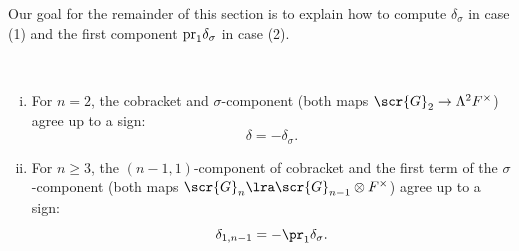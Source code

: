 \documentclass[a4paper]{amsart}
\begin{document}
Our goal for the remainder of this section is to explain how to compute $\delta_\sigma$ in case (1) and the first component $\rm{pr}_1 \delta_\sigma$ in case (2).

\begin{proposition}\label{prop:cobr-vs-sigma-component} \,
\begin{enumerate}[(i)]
    \item For $n=2$, the cobracket and $\sigma$-component (both maps $\scr{G}_2 \to \Lambda^2 F^\times$) agree up to a sign: 
    \[\delta = -\delta_\sigma.\]
    \item For $n \geq 3$, the $(n-1,1)$-component of cobracket and the first term of the $\sigma$-component (both maps $\scr{G}_n \lra \scr{G}_{n-1}\otimes F^\times$) agree up to a sign:
\[\delta_{1,n-1} = -\pr_1 \delta_\sigma.\]
\end{enumerate}
\end{proposition}
\end{document}
